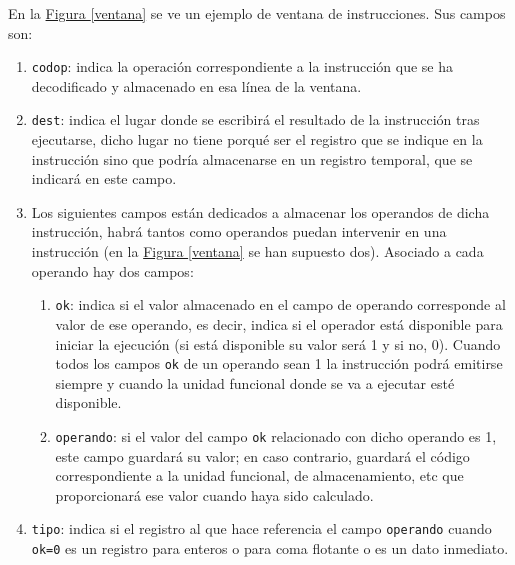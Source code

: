 \documentclass[10pt,a4paper,spanish]{report}
\begin{document}
En la \hyperref[ventana]{Figura \ref*{ventana}} se ve un ejemplo de ventana de instrucciones. Sus campos son:
\begin{enumerate}[\color{azul}{$\heartsuit$}]
    \item \verb*|codop|: indica la operación correspondiente a la instrucción que se ha decodificado y almacenado en esa línea de la ventana.
    \item \verb*|dest|: indica el lugar donde se escribirá el resultado de la instrucción tras ejecutarse, dicho lugar no tiene porqué ser el registro que se indique en la instrucción sino que podría almacenarse en un registro temporal, que se indicará en este campo.
    \item Los siguientes campos están dedicados a almacenar los operandos de dicha instrucción, habrá tantos como operandos puedan intervenir en una instrucción (en la \hyperref[ventana]{Figura \ref*{ventana}} se han supuesto dos). Asociado a cada operando hay dos campos:
    \begin{enumerate}[$\longrightarrow$]
        \item \verb*|ok|: indica si el valor almacenado en el campo de operando corresponde al valor de ese operando, es decir, indica si el operador está disponible para iniciar la ejecución (si está disponible su valor será 1 y si no, 0). Cuando todos los campos \verb*|ok| de un operando sean 1 la instrucción podrá emitirse siempre y cuando la unidad funcional donde se va a ejecutar esté disponible.
        \item \verb*|operando|: si el valor del campo \verb*|ok| relacionado con dicho operando es 1, este campo guardará su valor; en caso contrario, guardará el código correspondiente a la unidad funcional, de almacenamiento, etc que proporcionará ese valor cuando haya sido calculado.
    \end{enumerate}
    \item \verb*|tipo|: indica si el registro al que hace referencia el campo \verb*|operando| cuando \verb*|ok=0| es un registro para enteros o para coma flotante o es un dato inmediato.
\end{enumerate}
\end{document}
